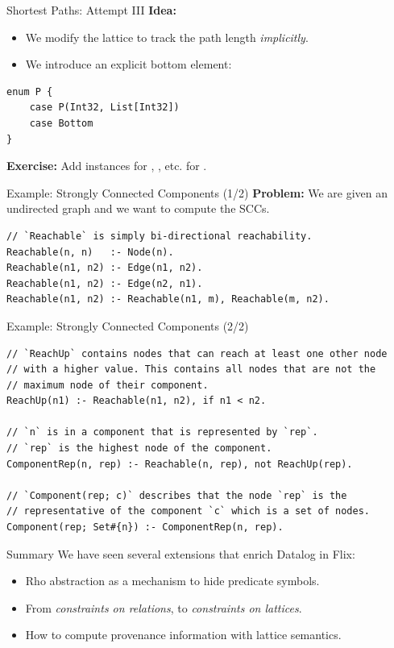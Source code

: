 \begin{frame}[fragile]{Shortest Paths: Attempt III}
\textbf{Idea:}

\begin{itemize}
    \item We modify the lattice to track the path length \emph{implicitly}.
    \item We introduce an explicit bottom element: 
\end{itemize}

\begin{lstlisting}[language=flix, xleftmargin=0.8cm]
enum P {
    case P(Int32, List[Int32])
    case Bottom
}
\end{lstlisting}

\textbf{Exercise:} Add instances for , , etc. for .
\end{frame}

\begin{frame}[fragile]{Example: Strongly Connected Components (1/2)}
\textbf{Problem:} We are given an undirected graph and we want to compute the SCCs.
\medskip
\begin{lstlisting}[language=flix, xleftmargin=0.8cm]
// `Reachable` is simply bi-directional reachability.
Reachable(n, n)   :- Node(n).
Reachable(n1, n2) :- Edge(n1, n2).
Reachable(n1, n2) :- Edge(n2, n1).
Reachable(n1, n2) :- Reachable(n1, m), Reachable(m, n2).
\end{lstlisting}
\end{frame}

\begin{frame}[fragile]{Example: Strongly Connected Components (2/2)}
\begin{lstlisting}[language=flix, xleftmargin=0.8cm]
// `ReachUp` contains nodes that can reach at least one other node 
// with a higher value. This contains all nodes that are not the 
// maximum node of their component.
ReachUp(n1) :- Reachable(n1, n2), if n1 < n2.

// `n` is in a component that is represented by `rep`.
// `rep` is the highest node of the component.
ComponentRep(n, rep) :- Reachable(n, rep), not ReachUp(rep).

// `Component(rep; c)` describes that the node `rep` is the 
// representative of the component `c` which is a set of nodes. 
Component(rep; Set#{n}) :- ComponentRep(n, rep).
\end{lstlisting}
\end{frame}

\begin{frame}{Summary}
We have seen several extensions that enrich Datalog in Flix:

\begin{itemize}
    \item Rho abstraction as a mechanism to hide predicate symbols.
    \item From \emph{constraints on relations}, to \emph{constraints on
    lattices}.
    \item How to compute provenance information with lattice semantics.
\end{itemize}
\end{frame}

\begin{frame}[standout]
\end{frame}



